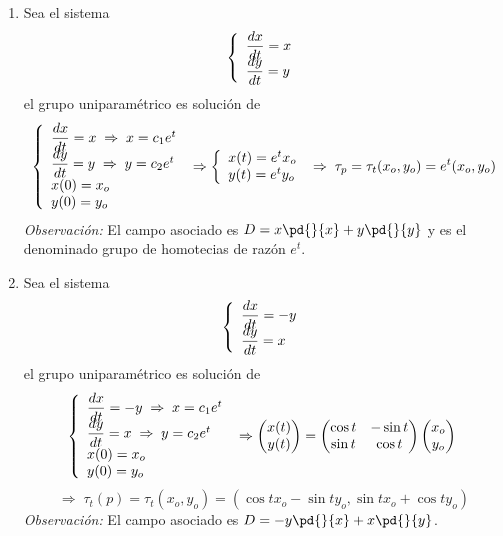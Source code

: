 \begin{ejes}
\begin{enumerate}
\item Sea el sistema 
 $$\left\{ \begin{array}{l}
              \dfrac{dx}{dt} = x \\
              \vspace{-5mm} \\
             \dfrac{dy}{dt} = y
\end{array} \right.$$ el grupo uniparamétrico es solución de
             $$\left\{ \begin{array}{l}
              \dfrac{dx}{dt} = x \; \Rightarrow \; x=c_1e^t  \\
              \vspace{-5mm} \\
             \dfrac{dy}{dt} = y \; \Rightarrow \; y=c_2e^t \\
             x(0) = x_o \\
             y(0) = y_o
\end{array} \right. \; \Rightarrow \left\{ \begin{array}{l}
     x(t)=e^t x_o\\
             y(t)=e^t y_o
\end{array}\right. \; \Rightarrow \; \tau_p=\tau_t(x_o,y_o)=e^t (x_o,y_o)$$
\textit{Observación:} El campo asociado es $D=x\pd{}{x}+y\pd{}{y}$ y es el denominado grupo de homotecias de razón $e^t$.
\item Sea el sistema 
 $$\left\{ \begin{array}{l}
              \dfrac{dx}{dt} = -y \\
              \vspace{-5mm} \\
             \dfrac{dy}{dt} = x
\end{array} \right.$$ el grupo uniparamétrico es solución de
             $$\left\{ \begin{array}{l}
              \dfrac{dx}{dt} = -y \; \Rightarrow \; x=c_1e^t  \\
              \vspace{-5mm} \\
             \dfrac{dy}{dt} = x \; \Rightarrow \; y=c_2e^t \\
             x(0) = x_o \\
             y(0) = y_o
\end{array} \right. \; \Rightarrow \begin{pmatrix}
    x(t) \\ y(t)
\end{pmatrix}=\begin{pmatrix}
    \cos t & -\sin t \\ \sin t & \cos t 
\end{pmatrix}\begin{pmatrix}
    x_o \\ y_o
\end{pmatrix}\;$$ $$ \Rightarrow \; \tau_t (p)=\tau_t(x_o,y_o)=(\cos t x_o - \sin t y_o , \sin t x_o+\cos t y_o)$$
\textit{Observación:} El campo asociado es $D=-y\pd{}{x}+x\pd{}{y}$.


\end{enumerate}
\end{ejes}
